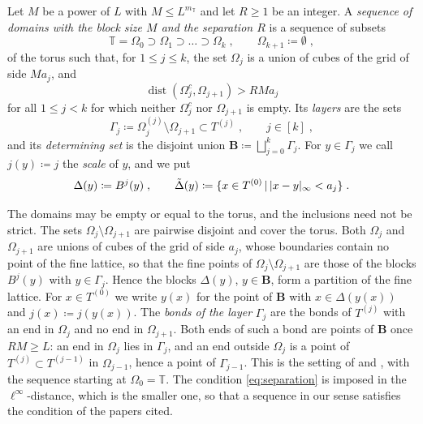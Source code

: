 \documentclass[11pt]{preprint}
\newcommand{\dist}{\operatorname{dist}}
\DeclarePairedDelimiter{\abs}{\lvert}{\rvert}
\numberwithin{equation}{section}
\begin{document}
\begin{definition}\label{def:sequence}
Let $M$ be a power of $L$ with $M \leqslant L^{m_{\mathbb T}}$ and let $R \geqslant 1$ be an integer. A \emph{sequence of domains with the block size $M$ and the separation $R$} is a sequence of subsets
\begin{equation}\label{eq:sequence}
    \mathbb T = \Omega_0 \supset \Omega_1 \supset \dots \supset \Omega_k\;,
    \qquad
    \Omega_{k+1} \coloneqq \emptyset\;,
\end{equation}
of the torus such that, for $1 \leqslant j \leqslant k$, the set $\Omega_j$ is a union of cubes of the grid of side $Ma_j$, and
\begin{equation}\label{eq:separation}
    \dist(\Omega_j^c, \Omega_{j+1}) > RMa_j
\end{equation}
for all $1 \leqslant j < k$ for which neither $\Omega_j^c$ nor $\Omega_{j+1}$ is empty. Its \emph{layers} are the sets
\begin{equation}\label{eq:layers}
    \Gamma_j \coloneqq \Omega_j^{(j)} \setminus \Omega_{j+1} \subset T^{(j)}\;,
    \qquad
    j \in [k]\;,
\end{equation}
and its \emph{determining set} is the disjoint union $\mathbf B \coloneqq \bigsqcup_{j=0}^{k}\Gamma_j$. For $y \in \Gamma_j$ we call $j(y) \coloneqq j$ the \emph{scale} of $y$, and we put
\begin{equation}\label{eq:cells}
    \Delta(y) \coloneqq B^j(y)\;,
    \qquad
    \tilde\Delta(y) \coloneqq \{ x \in T^{(0)} \,|\, \abs{x - y}_\infty < a_j \}\;.
\end{equation}
\end{definition}

The domains may be empty or equal to the torus, and the inclusions need not be strict. The sets $\Omega_j \setminus \Omega_{j+1}$ are pairwise disjoint and cover the torus. Both $\Omega_j$ and $\Omega_{j+1}$ are unions of cubes of the grid of side $a_j$, whose boundaries contain no point of the fine lattice, so that the fine points of $\Omega_j \setminus \Omega_{j+1}$ are those of the blocks $B^j(y)$ with $y \in \Gamma_j$. Hence the blocks $\Delta(y)$, $y \in \mathbf B$, form a partition of the fine lattice. For $x \in T^{(0)}$ we write $y(x)$ for the point of $\mathbf B$ with $x \in \Delta(y(x))$ and $j(x) \coloneqq j(y(x))$. The \emph{bonds of the layer} $\Gamma_j$ are the bonds of $T^{(j)}$ with an end in $\Omega_j$ and no end in $\Omega_{j+1}$. Both ends of such a bond are points of $\mathbf B$ once $RM \geqslant L$: an end in $\Omega_j$ lies in $\Gamma_j$, and an end outside $\Omega_j$ is a point of $T^{(j)} \subset T^{(j-1)}$ in $\Omega_{j-1}$, hence a point of $\Gamma_{j-1}$. This is the setting of \cite[(2.1)--(2.4), p.~224]{BalabanPRT2} and \cite[p.~277]{BalabanVAR}, with the sequence starting at $\Omega_0 = \mathbb T$. The condition \eqref{eq:separation} is imposed in the $\ell^\infty$-distance, which is the smaller one, so that a sequence in our sense satisfies the condition of the papers cited.
\end{document}
